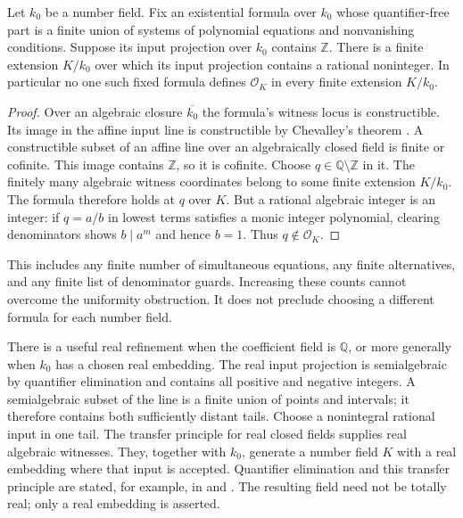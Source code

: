 \begin{theorem}\label{thm:no-uniform-existential-integer-rings-phase3}
Let $k_0$ be a number field.  Fix an existential formula over
$k_0$ whose quantifier-free part is a finite union of systems
of polynomial equations and nonvanishing conditions.
Suppose its input projection over $k_0$ contains $\mathbb Z$.
There is a finite extension $K/k_0$ over which its input
projection contains a rational noninteger.  In particular no
one such fixed formula defines $\mathcal O_K$ in every finite
extension $K/k_0$.
\end{theorem}
\begin{proof}
Over an algebraic closure $\overline{k_0}$ the formula's
witness locus is constructible.  Its image in the affine
input line is constructible by Chevalley's theorem
\cite[Tag 00FE]{StacksChevalley}.  A constructible subset of
an affine line over an algebraically closed field is finite
or cofinite.  This image contains $\mathbb Z$, so it is
cofinite.  Choose $q\in\mathbb Q\setminus\mathbb Z$ in it.
The finitely many algebraic witness coordinates belong to
some finite extension $K/k_0$.  The formula therefore holds
at $q$ over $K$.  But a rational algebraic integer is an
integer: if $q=a/b$ in lowest terms satisfies a monic
integer polynomial, clearing denominators shows $b\mid a^m$
and hence $b=1$.  Thus $q\notin\mathcal O_K$.
\end{proof}

This includes any finite number of simultaneous equations,
any finite alternatives, and any finite list of denominator
guards.  Increasing these counts cannot overcome the
uniformity obstruction.  It does not preclude choosing a
different formula for each number field.

There is a useful real refinement when the coefficient field
is $\mathbb Q$, or more generally when $k_0$ has a chosen
real embedding.  The real input projection is semialgebraic
by quantifier elimination and contains all positive and
negative integers.  A semialgebraic subset of the line is
a finite union of points and intervals; it therefore contains
both sufficiently distant tails.  Choose a nonintegral
rational input in one tail.  The transfer principle for real
closed fields supplies real algebraic witnesses.  They,
together with $k_0$, generate a number field $K$ with a real
embedding where that input is accepted.  Quantifier
elimination and this transfer principle are stated, for
example, in \cite[Theorem 2.1]{Basu2014} and
\cite[Corollary 4.5 and Example 4.6]{Plaumann2023}.
The resulting field need not be totally real; only a real
embedding is asserted.

